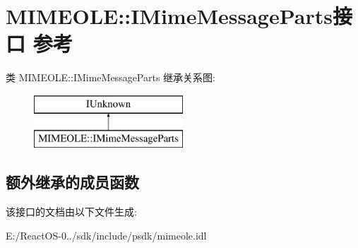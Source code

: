 \hypertarget{interface_m_i_m_e_o_l_e_1_1_i_mime_message_parts}{}\section{M\+I\+M\+E\+O\+LE\+:\+:I\+Mime\+Message\+Parts接口 参考}
\label{interface_m_i_m_e_o_l_e_1_1_i_mime_message_parts}
类 M\+I\+M\+E\+O\+LE\+:\+:I\+Mime\+Message\+Parts 继承关系图\+:\begin{figure}[H]
\begin{center}
\leavevmode
\includegraphics[height=2.000000cm]{interface_m_i_m_e_o_l_e_1_1_i_mime_message_parts}
\end{center}
\end{figure}
\subsection*{额外继承的成员函数}


该接口的文档由以下文件生成\+:\begin{DoxyCompactItemize}
\item 
E\+:/\+React\+O\+S-\/0../sdk/include/psdk/mimeole.\+idl\end{DoxyCompactItemize}
